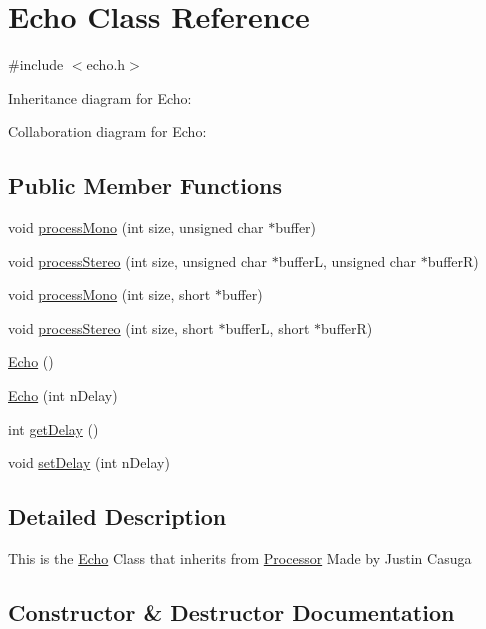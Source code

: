 \hypertarget{classEcho}{}\section{Echo Class Reference}
\label{classEcho}


{\ttfamily \#include $<$echo.\+h$>$}



Inheritance diagram for Echo\+:


Collaboration diagram for Echo\+:
\subsection*{Public Member Functions}
\begin{DoxyCompactItemize}
\item 
void \hyperlink{classEcho_aa986059869416324c246a403e09c584d}{process\+Mono} (int size, unsigned char $\ast$buffer)
\item 
void \hyperlink{classEcho_adadbb432a61bd1e2036f0690bfe0b1a0}{process\+Stereo} (int size, unsigned char $\ast$bufferL, unsigned char $\ast$bufferR)
\item 
void \hyperlink{classEcho_af5155cf6165be0317de49e4498268062}{process\+Mono} (int size, short $\ast$buffer)
\item 
void \hyperlink{classEcho_afa8da13f6e9b0a490c4a03cc683ff6e2}{process\+Stereo} (int size, short $\ast$bufferL, short $\ast$bufferR)
\item 
\hyperlink{classEcho_ababd42898feed0775f5234d53fe9bff1}{Echo} ()
\item 
\hyperlink{classEcho_a886f34b24dd78cefc0e76e965d2aec12}{Echo} (int n\+Delay)
\item 
int \hyperlink{classEcho_a57e19c9232f9bb96ccd78ba4bb68d6c9}{get\+Delay} ()
\item 
void \hyperlink{classEcho_acb5bd7a6c5d2d53d79189458b9342583}{set\+Delay} (int n\+Delay)
\end{DoxyCompactItemize}


\subsection{Detailed Description}
This is the \hyperlink{classEcho}{Echo} Class that inherits from \hyperlink{classProcessor}{Processor} Made by Justin Casuga 

\subsection{Constructor \& Destructor Documentation}
\mbox{\label{classEcho_ababd42898feed0775f5234d53fe9bff1}} 
